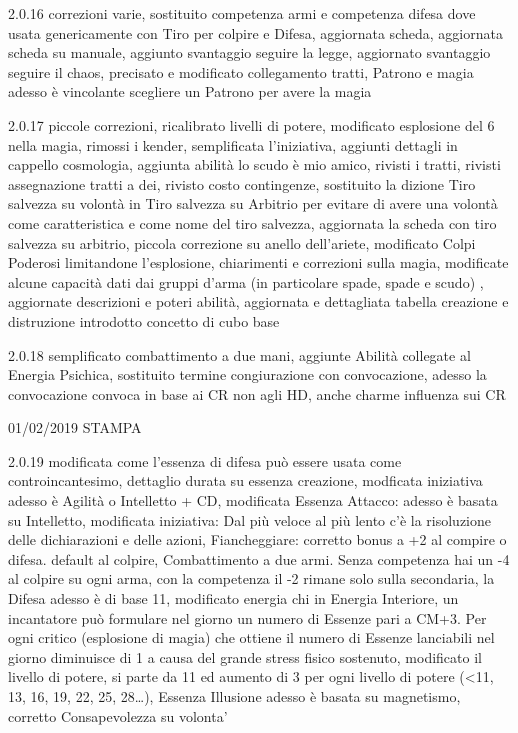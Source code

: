 \documentclass[a4paper,11pt,twoside,openany]{book}
\begin{document}
{{	2.0.16 correzioni varie, sostituito competenza armi e competenza difesa dove usata genericamente con Tiro per colpire e Difesa, aggiornata scheda, aggiornata scheda su manuale, aggiunto svantaggio seguire la legge, aggiornato svantaggio seguire il chaos, precisato e modificato collegamento tratti, Patrono e magia adesso è vincolante scegliere un Patrono per avere la magia

	2.0.17 piccole correzioni, ricalibrato livelli di potere, modificato esplosione del 6 nella magia, rimossi i kender, semplificata l'iniziativa, aggiunti dettagli in cappello cosmologia, aggiunta abilità lo scudo è mio amico, rivisti i tratti, rivisti assegnazione tratti a dei, rivisto costo contingenze, sostituito la dizione Tiro salvezza su volontà in Tiro salvezza su Arbitrio per evitare di avere una volontà come caratteristica e come nome del tiro salvezza, aggiornata la scheda con tiro salvezza su arbitrio, piccola correzione su anello dell'ariete, modificato Colpi Poderosi limitandone l'esplosione, chiarimenti e correzioni sulla magia, modificate alcune capacità dati dai gruppi d'arma (in particolare spade, spade e scudo) , aggiornate descrizioni e poteri abilità, aggiornata e dettagliata tabella creazione e distruzione introdotto concetto di cubo base

	2.0.18 semplificato combattimento a due mani, aggiunte Abilità collegate al Energia Psichica, sostituito termine congiurazione con convocazione, adesso la convocazione convoca in base ai CR non agli HD, anche charme influenza sui CR

	01/02/2019 STAMPA

	2.0.19 modificata come l'essenza di difesa può essere usata come controincantesimo, dettaglio durata su essenza creazione, modficata iniziativa adesso è Agilità o Intelletto + CD, modificata Essenza Attacco: adesso è basata su Intelletto, modificata iniziativa: Dal più veloce al più lento c'è la risoluzione delle dichiarazioni e delle azioni, Fiancheggiare: corretto bonus a +2 al compire o difesa. default al colpire, Combattimento a due armi. Senza competenza hai un -4 al colpire su ogni arma, con la competenza il -2 rimane solo sulla secondaria, la Difesa adesso è di base 11, modificato energia chi in Energia Interiore, un incantatore può formulare nel giorno un numero di Essenze pari a CM+3. Per ogni critico (esplosione di magia) che ottiene il numero di Essenze lanciabili nel giorno diminuisce di 1 a causa del grande stress fisico sostenuto, modificato il livello di potere, si parte da 11 ed aumento di 3 per ogni livello di potere (\textless11, 13, 16, 19, 22, 25, 28\ldots ), Essenza Illusione adesso è basata su magnetismo, corretto Consapevolezza su volonta'

}}
\end{document}
